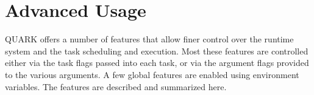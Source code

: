 \documentclass[11pt,letterpaper]{report}
\begin{document}





\chapter{Advanced Usage}

QUARK offers a number of features that allow finer control over the
runtime system and the task scheduling and execution.  Most these
features are controlled either via the task flags passed into each
task, or via the argument flags provided to the various arguments.  A
few global features are enabled using environment variables.  The
features are described and summarized here.
\end{document}
